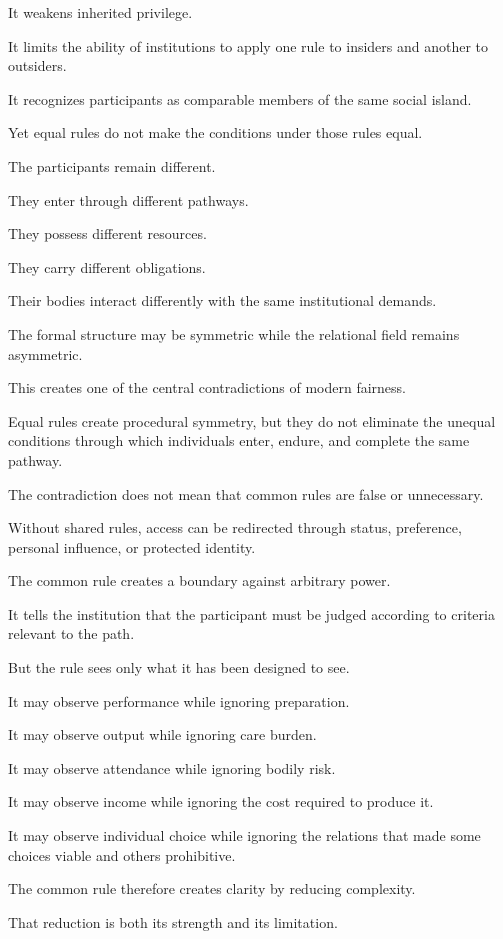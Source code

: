 It weakens inherited privilege.

It limits the ability of institutions to apply one rule to insiders and another to outsiders.

It recognizes participants as comparable members of the same social island.

Yet equal rules do not make the conditions under those rules equal.

The participants remain different.

They enter through different pathways.

They possess different resources.

They carry different obligations.

Their bodies interact differently with the same institutional demands.

The formal structure may be symmetric while the relational field remains asymmetric.

This creates one of the central contradictions of modern fairness.

Equal rules create procedural symmetry, but they do not eliminate the unequal conditions through which individuals enter, endure, and complete the same pathway.

The contradiction does not mean that common rules are false or unnecessary.

Without shared rules, access can be redirected through status, preference, personal influence, or protected identity.

The common rule creates a boundary against arbitrary power.

It tells the institution that the participant must be judged according to criteria relevant to the path.

But the rule sees only what it has been designed to see.

It may observe performance while ignoring preparation.

It may observe output while ignoring care burden.

It may observe attendance while ignoring bodily risk.

It may observe income while ignoring the cost required to produce it.

It may observe individual choice while ignoring the relations that made some choices viable and others prohibitive.

The common rule therefore creates clarity by reducing complexity.

That reduction is both its strength and its limitation.

